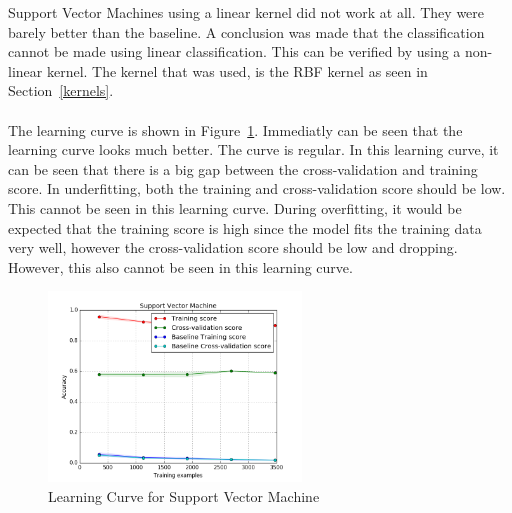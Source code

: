 Support Vector Machines using a linear kernel did not work at all. They were barely better than the baseline. A conclusion was made that the classification cannot be made using linear classification. This can be verified by using a non-linear kernel. The kernel that was used, is the RBF kernel as seen in Section~\ref{kernels}. \\
\\
The learning curve is shown in Figure~\ref{fig:svmlearn}. Immediatly can be seen that the learning curve looks much better. The curve is regular. In this learning curve, it can be seen that there is a big gap between the cross-validation and training score. In underfitting, both the training and cross-validation score should be low. This cannot be seen in this learning curve. During overfitting, it would be expected that the training score is high since the model fits the training data very well, however the cross-validation score should be low and dropping. However, this also cannot be seen in this learning curve.

 \begin{figure}[H]
\centering
\includegraphics[width=0.6\textwidth]{Figures/Support_Vector_Machine}
\decoRule
\caption[Learning Curve for Support Vector Machine]{Learning Curve for Support Vector Machine}
\label{fig:svmlearn}
\end{figure}

